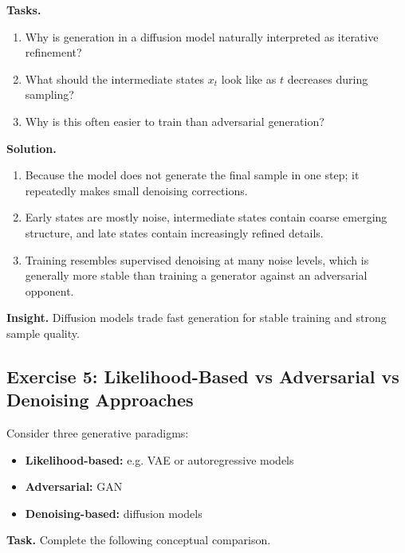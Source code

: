 \medskip

\noindent
\textbf{Tasks.}
\begin{enumerate}
    \item Why is generation in a diffusion model naturally interpreted as iterative refinement?
    \item What should the intermediate states \(x_t\) look like as \(t\) decreases during sampling?
    \item Why is this often easier to train than adversarial generation?
\end{enumerate}

\medskip

\noindent
\textbf{Solution.}
\begin{enumerate}
    \item Because the model does not generate the final sample in one step; it repeatedly makes small denoising corrections.

    \item Early states are mostly noise, intermediate states contain coarse emerging structure, and late states contain increasingly refined details.

    \item Training resembles supervised denoising at many noise levels, which is generally more stable than training a generator against an adversarial opponent.
\end{enumerate}

\medskip

\noindent
\textbf{Insight.}  
Diffusion models trade fast generation for stable training and strong sample quality.

\subsection{Exercise 5: Likelihood-Based vs Adversarial vs Denoising Approaches}

Consider three generative paradigms:

\begin{itemize}
    \item \textbf{Likelihood-based:} e.g. VAE or autoregressive models
    \item \textbf{Adversarial:} GAN
    \item \textbf{Denoising-based:} diffusion models
\end{itemize}

\medskip

\noindent
\textbf{Task.}  
Complete the following conceptual comparison.

